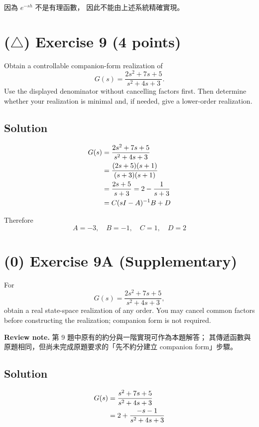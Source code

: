 \documentclass[12pt,a4paper]{article}
\begin{document}
因為 $e^{-sh}$ 不是有理函數， 因此不能由上述系統精確實現。

\vspace{3cm}
\clearpage
\section*{($\triangle$) Exercise 9 \hfill {\normalsize (4 points)}}
Obtain a controllable companion-form realization of
\[
G(s)=\frac{2s^2+7s+5}{s^2+4s+3}.
\]
Use the displayed denominator without cancelling factors first. Then determine whether your realization is minimal and, if needed, give a lower-order realization.
\subsection*{Solution}

\begin{align*}
	G(s) &= {2s^2 + 7s + 5 \over s^2 + 4s + 3} \\
	&= { (2s + 5) (s + 1) \over (s + 3)(s + 1) } \\
	&= {2s + 5 \over s + 3} = 2 - {1\over s + 3} \\
	&= C(sI -A)^{-1} B +D
\end{align*}

Therefore
\[
A = -3, \quad B = -1, \quad C = 1,\quad D = 2
\]


\vspace{3cm}
\vfill
\clearpage
\section*{(0) Exercise 9A \hfill {\normalsize (Supplementary)}}
For
\[
G(s)=\frac{2s^2+7s+5}{s^2+4s+3},
\]
obtain a real state-space realization of any order. You may cancel common
factors before constructing the realization; companion form is not required.

\textbf{Review note.} 第 9 題中原有的約分與一階實現可作為本題解答；
其傳遞函數與原題相同，但尚未完成原題要求的「先不約分建立 companion form」步驟。

\subsection*{Solution}

\begin{align*}
	G(s) &= { s^2 + 7s + 5 \over s^2 + 4s + 3 } \\
	&= {2 + { -s-1 \over s^2 + 4s +3}}
\end{align*}
\end{document}
